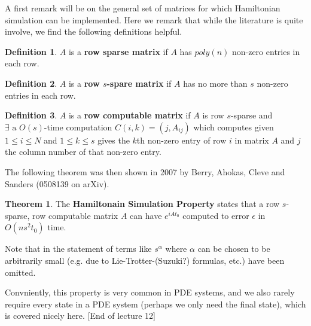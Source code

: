 \documentclass{article}
\theoremstyle{definition}
\newtheorem{definition}{Definition}
\newtheorem{theorem}{Theorem}
\begin{document}
A first remark will be on the general set of matrices for which Hamiltonian
simulation can be implemented. Here we remark that while the literature is quite
involve, we find the following definitions helpful.

\begin{definition}
  $A$ is a \textbf{row sparse matrix} if $A$ has $poly(n)$ non-zero entries in
  each row.
\end{definition}

\begin{definition}
  $A$ is a \textbf{row $s$-spare matrix} if $A$ has no more than $s$ non-zero
  entries in each row.
\end{definition}

\begin{definition}
  $A$ is a \textbf{row computable matrix} if $A$ is row $s$-sparse and $\exists
  \text{ a }O(s)$-time computation $C(i, k) = (j, A_{ij})$ which computes given
  $1 \leq i \leq N$ and $1 \leq k \leq s$ gives the $k$th non-zero entry of row
  $i$ in matrix $A$ and $j$ the column number of that non-zero entry.
\end{definition}

The following theorem was then shown in 2007 by Berry, Ahokas, Cleve and
Sanders (0508139 on arXiv).

\begin{theorem}
  The \textbf{Hamiltonain Simulation Property} states that a row $s$-sparse, row
  computable matrix $A$ can have $e^{iAt_0}$ computed to error $\epsilon$ in
  $O(n s^2 t_0)$ time.
\end{theorem}

Note that in the statement of terms like $s^\alpha$ where $\alpha$ can be chosen
to be arbitrarily small (e.g. due to Lie-Trotter-(Suzuki?) formulas, etc.) have
been omitted.

Convniently, this property is very common in PDE systems, and we also rarely
require every state in a PDE system (perhaps we only need the final state),
which is covered nicely here. [End of lecture 12]
\end{document}

